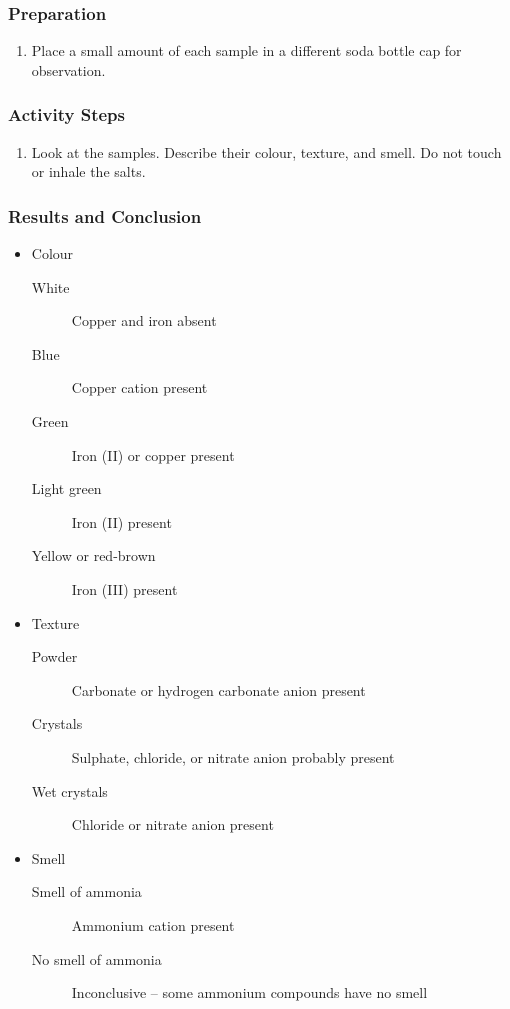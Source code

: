 \subsubsection{Preparation}
\begin{enumerate}
\item{Place a small amount of each sample in a different soda bottle cap for observation.}
\end{enumerate}

\subsubsection{Activity Steps}
\begin{enumerate}
\item{Look at the samples. Describe their colour, texture, and smell. Do not touch or inhale the salts.}
\end{enumerate}

\subsubsection{Results and Conclusion}
\begin{itemize}
\item{Colour}
\begin{description}
\item[White]{Copper and iron absent}
\item[Blue]{Copper cation present}
\item[Green]{Iron (II) or copper present}
\item[Light green]{Iron (II) present}
\item[Yellow or red-brown]{Iron (III) present}
\end{description}
\item{Texture}
\begin{description}
\item[Powder]{Carbonate or hydrogen carbonate anion present}
\item[Crystals]{Sulphate, chloride, or nitrate anion probably present}
\item[Wet crystals]{Chloride or nitrate anion present}
\end{description}
\item{Smell}
\begin{description}
\item[Smell of ammonia]{Ammonium cation present}
\item[No smell of ammonia]{Inconclusive -- some ammonium compounds have no smell}
\end{description}
\end{itemize}

